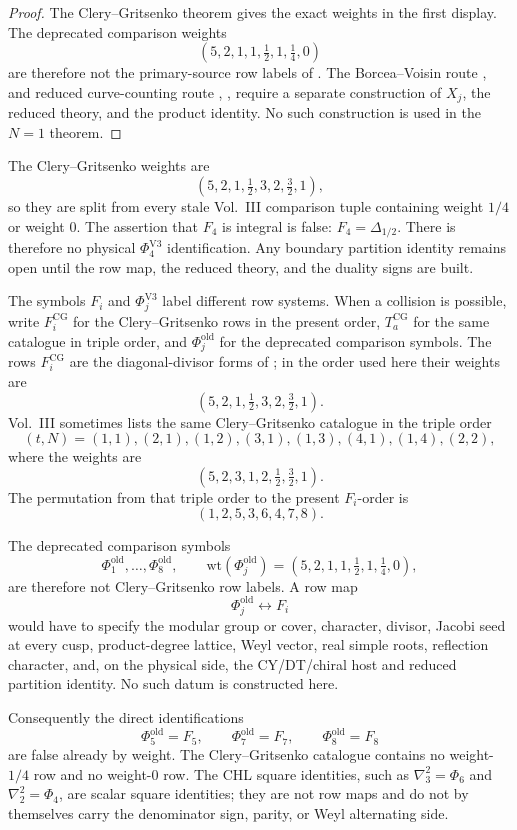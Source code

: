 \documentclass[11pt]{memoir}
\begin{document}
\begin{proof}
The Clery--Gritsenko theorem gives the exact weights in the first
display.  The deprecated comparison weights
$$
(5,2,1,1,\tfrac12,1,\tfrac14,0)
$$
are therefore not the primary-source row labels of \cite{GC}.  The
Borcea--Voisin route \cite{BORCEA}, \cite{VOISIN} and reduced
curve-counting route \cite{OhThomasI}, \cite{OhThomasII}, \cite{BOPY}
require a separate
construction of $X_j$, the reduced theory, and the product identity.  No
such construction is used in the $N=1$ theorem.
\end{proof}

\begin{remark}
The Clery--Gritsenko weights are
\[
(5,2,1,\tfrac12,3,2,\tfrac32,1),
\]
so they are split from every stale Vol.~III comparison tuple containing
weight \(1/4\) or weight \(0\).  The assertion that \(F_4\) is integral
is false: \(F_4=\Delta_{1/2}\).  There is therefore no physical
\(\Phi^{\mathrm{V3}}_4\) identification.  Any boundary
partition identity remains open until the row map, the reduced theory,
and the duality signs are built.
\end{remark}

\begin{remark}
The symbols \(F_i\) and \(\Phi^{\mathrm{V3}}_j\) label different row
systems.  When a collision is possible, write \(F_i^{\mathrm{CG}}\) for
the Clery--Gritsenko rows in the present order,
\(T_a^{\mathrm{CG}}\) for the same catalogue in triple order, and
\(\Phi^{\mathrm{old}}_j\) for the deprecated comparison symbols.  The rows
\(F_i^{\mathrm{CG}}\) are the diagonal-divisor
forms of \cite{GC}; in the order used here their weights are
$$
(5,2,1,\tfrac12,3,2,\tfrac32,1).
$$
Vol.~III sometimes lists the same Clery--Gritsenko catalogue in the
triple order
$$
(t,N)=(1,1),(2,1),(1,2),(3,1),(1,3),(4,1),(1,4),(2,2),
$$
where the weights are
$$
(5,2,3,1,2,\tfrac12,\tfrac32,1).
$$
The permutation from that triple order to the present \(F_i\)-order is
$$
(1,2,5,3,6,4,7,8).
$$

The deprecated comparison symbols
$$
\Phi^{\mathrm{old}}_1,\ldots,\Phi^{\mathrm{old}}_8,\qquad
\mathrm{wt}(\Phi^{\mathrm{old}}_j)=(5,2,1,1,\tfrac12,1,\tfrac14,0),
$$
are therefore not Clery--Gritsenko row labels.  A row map
$$
\Phi^{\mathrm{old}}_j\longleftrightarrow F_i
$$
would have to specify the modular group or cover, character, divisor,
Jacobi seed at every cusp, product-degree lattice, Weyl vector, real
simple roots, reflection character, and, on the physical side, the
CY/DT/chiral host and reduced partition identity.  No such datum is
constructed here.

Consequently the direct identifications
$$
\Phi^{\mathrm{old}}_5=F_5,\qquad
\Phi^{\mathrm{old}}_7=F_7,\qquad
\Phi^{\mathrm{old}}_8=F_8
$$
are false already by weight.  The Clery--Gritsenko catalogue contains
no weight-\(1/4\) row and no weight-\(0\) row.  The CHL square
identities, such as \(\nabla_3^2=\Phi_6\) and
\(\nabla_2^2=\Phi_4\), are scalar square identities; they are not row
maps and do not by themselves carry the denominator sign, parity, or
Weyl alternating side.
\end{remark}
\end{document}
